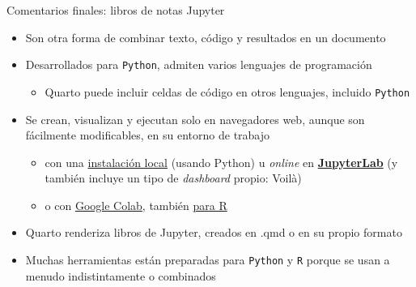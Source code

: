 \documentclass[
  10pt,
  ignorenonframetext,
]{beamer}
\providecommand{\tightlist}{%
  \setlength{\itemsep}{0pt}\setlength{\parskip}{0pt}}\usepackage{longtable,booktabs,array}
\begin{document}
\begin{frame}[fragile]{Comentarios finales: libros de notas Jupyter}
\label{comentarios-finales-libros-de-notas-jupyter}
\begin{itemize}
\item
  Son otra forma de combinar texto, código y resultados en un documento
\item
  Desarrollados para \texttt{Python}, admiten varios lenguajes de
  programación

  \begin{itemize}
  \tightlist
  \item
    Quarto puede incluir celdas de código en otros lenguajes, incluido
    \texttt{Python}
  \end{itemize}
\item
  Se crean, visualizan y ejecutan solo en navegadores web, aunque son
  fácilmente modificables, en su entorno de trabajo

  \begin{itemize}
  \item
    con una \href{https://jupyter.org/install}{instalación local}
    (usando Python) u \emph{online} en
    \href{https://jupyter.org/try}{\textbf{JupyterLab}} (y también
    incluye un tipo de \emph{dashboard} propio: Voilà)
  \item
    o con \href{https://colab.research.google.com/}{Google Colab},
    también
    \href{https://colab.research.google.com/\#create=true&language=r}{para
    R}
  \end{itemize}
\item
  Quarto renderiza libros de Jupyter, creados en .qmd o en su propio
  formato
\item
  Muchas herramientas están preparadas para \texttt{Python} y \texttt{R}
  porque se usan a menudo indistintamente o combinados
\end{itemize}
\end{frame}
\end{document}
